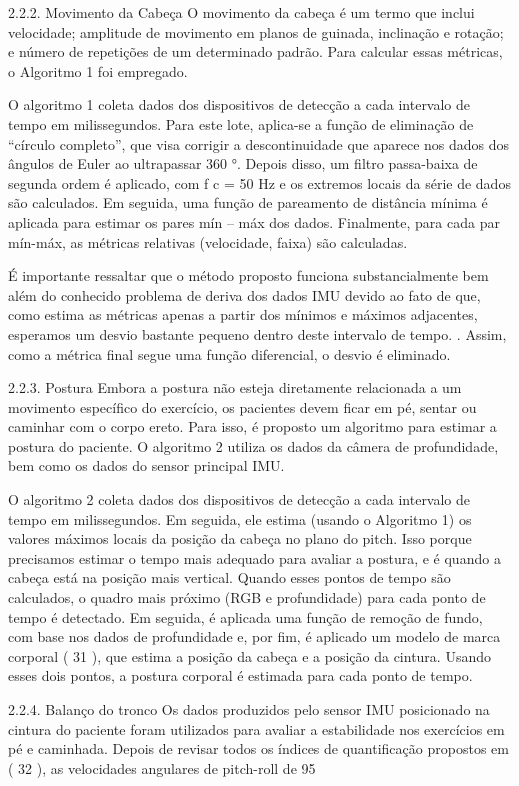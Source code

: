 \documentclass[10pt,a4paper,compsoc]{IEEEtran}
\begin{document}
2.2.2. Movimento da Cabeça
O movimento da cabeça é um termo que inclui velocidade; amplitude de movimento em planos de guinada, inclinação e rotação; e número de repetições de um determinado padrão. Para calcular essas métricas, o Algoritmo 1 foi empregado.

O algoritmo 1 coleta dados dos dispositivos de detecção a cada intervalo de tempo em milissegundos. Para este lote, aplica-se a função de eliminação de “círculo completo”, que visa corrigir a descontinuidade que aparece nos dados dos ângulos de Euler ao ultrapassar 360 °. Depois disso, um filtro passa-baixa de segunda ordem é aplicado, com f c = 50 Hz e os extremos locais da série de dados são calculados. Em seguida, uma função de pareamento de distância mínima é aplicada para estimar os pares mín – máx dos dados. Finalmente, para cada par mín-máx, as métricas relativas (velocidade, faixa) são calculadas.

É importante ressaltar que o método proposto funciona substancialmente bem além do conhecido problema de deriva dos dados IMU devido ao fato de que, como estima as métricas apenas a partir dos mínimos e máximos adjacentes, esperamos um desvio bastante pequeno dentro deste intervalo de tempo. . Assim, como a métrica final segue uma função diferencial, o desvio é eliminado.

2.2.3. Postura
Embora a postura não esteja diretamente relacionada a um movimento específico do exercício, os pacientes devem ficar em pé, sentar ou caminhar com o corpo ereto. Para isso, é proposto um algoritmo para estimar a postura do paciente. O algoritmo 2 utiliza os dados da câmera de profundidade, bem como os dados do sensor principal IMU.

O algoritmo 2 coleta dados dos dispositivos de detecção a cada intervalo de tempo em milissegundos. Em seguida, ele estima (usando o Algoritmo 1) os valores máximos locais da posição da cabeça no plano do pitch. Isso porque precisamos estimar o tempo mais adequado para avaliar a postura, e é quando a cabeça está na posição mais vertical. Quando esses pontos de tempo são calculados, o quadro mais próximo (RGB e profundidade) para cada ponto de tempo é detectado. Em seguida, é aplicada uma função de remoção de fundo, com base nos dados de profundidade e, por fim, é aplicado um modelo de marca corporal ( 31 ), que estima a posição da cabeça e a posição da cintura. Usando esses dois pontos, a postura corporal é estimada para cada ponto de tempo.

2.2.4. Balanço do tronco
Os dados produzidos pelo sensor IMU posicionado na cintura do paciente foram utilizados para avaliar a estabilidade nos exercícios em pé e caminhada. Depois de revisar todos os índices de quantificação propostos em ( 32 ), as velocidades angulares de pitch-roll de 95%
\end{document}
